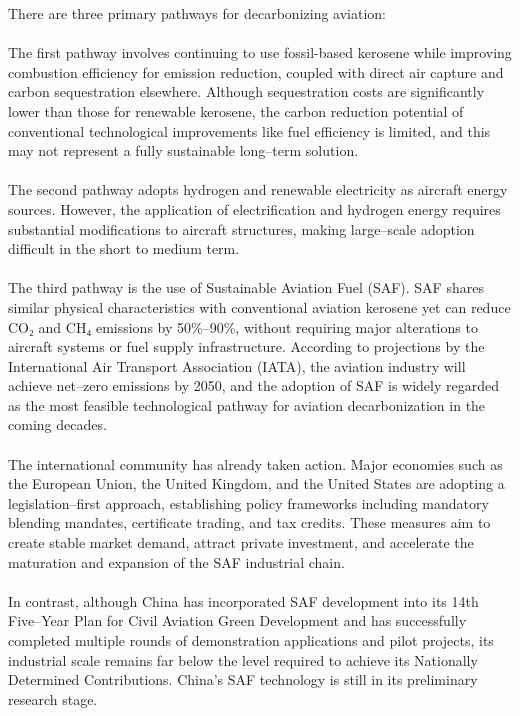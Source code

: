 \documentclass[a4paper,11pt]{article}
\begin{document}
There are three primary pathways for decarbonizing aviation:\\
\\
The first pathway involves continuing to use fossil-based kerosene while improving combustion efficiency for emission reduction, coupled with direct air capture and carbon sequestration elsewhere. Although sequestration costs are significantly lower than those for renewable kerosene, the carbon reduction potential of conventional technological improvements like fuel efficiency is limited, and this may not represent a fully sustainable long--term solution.\\
\\
The second pathway adopts hydrogen and renewable electricity as aircraft energy sources. However, the application of electrification and hydrogen energy requires substantial modifications to aircraft structures, making large--scale adoption difficult in the short to medium term.\\
\\
The third pathway is the use of Sustainable Aviation Fuel (SAF). SAF shares similar physical characteristics with conventional aviation kerosene yet can reduce CO₂ and CH₄ emissions by 50\%--90\%, without requiring major alterations to aircraft systems or fuel supply infrastructure. According to projections by the International Air Transport Association (IATA), the aviation industry will achieve net--zero emissions by 2050, and the adoption of SAF is widely regarded as the most feasible technological pathway for aviation decarbonization in the coming decades.\\
\\
The international community has already taken action. Major economies such as the European Union, the United Kingdom, and the United States are adopting a legislation--first approach, establishing policy frameworks including mandatory blending mandates, certificate trading, and tax credits. These measures aim to create stable market demand, attract private investment, and accelerate the maturation and expansion of the SAF industrial chain.\\
\\
In contrast, although China has incorporated SAF development into its 14th Five--Year Plan for Civil Aviation Green Development and has successfully completed multiple rounds of demonstration applications and pilot projects, its industrial scale remains far below the level required to achieve its Nationally Determined Contributions. China's SAF technology is still in its preliminary research stage.\\
\end{document}
